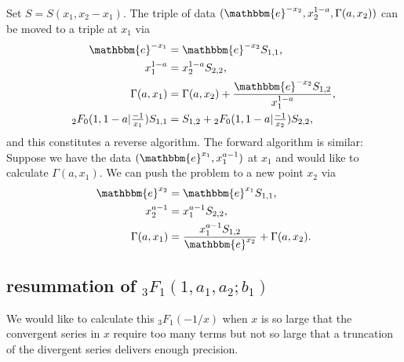 \documentclass[12pt]{article}
\newcommand{\ee}[0] {\mathbbm{e}}
\numberwithin{equation}{section}
\newcommand{\Head}[3] {{}_{#1}{#2}_{#3}}
\begin{document}
Set $S = S(x_1, x_2-x_1)$. The triple of data $(\ee^{-x_2}, x_2^{1-a}, \Gamma(a, x_2))$ can be moved to a triple at $x_1$ via
\begin{align*}
\ee^{-x_1} &= \ee^{-x_2} S_{1,1}\text{,}\\
x_1^{1-a} &= x_2^{1-a} S_{2,2}\text{,}\\
\Gamma(a, x_1) &= \Gamma(a,x_2) + \frac{\ee^{-x_2} S_{1,2}}{x_1^{1-a}}\text{,}\\
{}_2 F_0(1,1-a|\tfrac{-1}{x_1}) S_{1,1} &= S_{1,2}+ {}_2 F_0(1,1-a|\tfrac{-1}{x_2}) S_{2,2}\text{,}
\end{align*}
and this constitutes a reverse algorithm. The forward algorithm is similar: Suppose we have the data $(\ee^{x_1}, x_1^{a-1})$ at $x_1$ and would like to calculate $\Gamma(a,x_1)$. We can push the problem to a new point $x_2$ via
\begin{align*}
\ee^{x_2} &= \ee^{x_1} S_{1,1}\text{,}\\
x_2^{a-1} &= x_1^{a-1} S_{2,2}\text{,}\\
\Gamma(a, x_1) &= \frac{x_1^{a-1} S_{1,2}}{ \ee^{x_2}} + \Gamma(a,x_2)\text{.}
\end{align*}

\subsection{resummation of ${}_3 F_1(1,a_1,a_2;b_1)$}
We would like to calculate this $\Head3F1(-1/x)$ when $x$ is so large that the convergent series in $x$ require too many terms but not so large that a truncation of the divergent series delivers enough precision.
\end{document}
